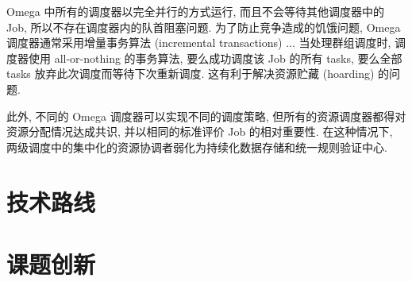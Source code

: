 \documentclass[UTF8,a4paper]{ctexart}
\begin{document}
Omega 中所有的调度器以完全并行的方式运行, 而且不会等待其他调度器中的 Job, 所以不存在调度器内的队首阻塞问题. 为了防止竞争造成的饥饿问题, Omega 调度器通常采用增量事务算法 (incremental transactions) ... 当处理群组调度时, 调度器使用 all-or-nothing 的事务算法, 要么成功调度该 Job 的所有 tasks, 要么全部 tasks 放弃此次调度而等待下次重新调度. 这有利于解决资源贮藏 (hoarding) 的问题.

此外, 不同的 Omega 调度器可以实现不同的调度策略, 但所有的资源调度器都得对资源分配情况达成共识, 并以相同的标准评价 Job 的相对重要性. 在这种情况下, 两级调度中的集中化的资源协调者弱化为持续化数据存储和统一规则验证中心. 

\section{技术路线}
\section{课题创新}
\end{document}
